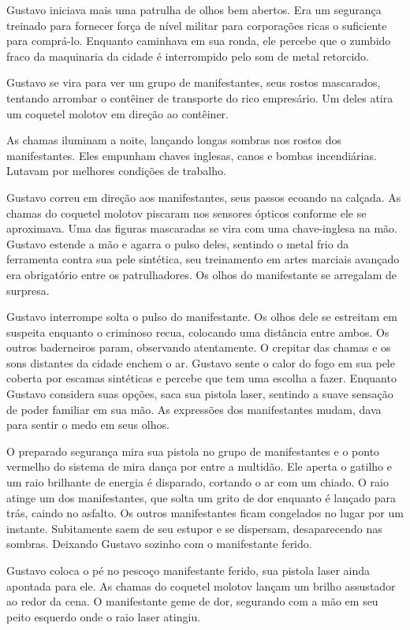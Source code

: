 \documentclass[a4paper,14pt]{book}
\begin{document}
Gustavo iniciava mais uma patrulha de olhos bem abertos. Era um segurança treinado para fornecer força de nível militar para corporações ricas o suficiente para comprá-lo. Enquanto caminhava em sua ronda, ele percebe que o zumbido fraco da maquinaria da cidade é interrompido pelo som de metal retorcido.

Gustavo se vira para ver um grupo de manifestantes, seus rostos mascarados, tentando arrombar o contêiner de transporte do rico empresário. Um deles atira um coquetel molotov em direção ao contêiner.

As chamas iluminam a noite, lançando longas sombras nos rostos dos manifestantes. Eles empunham chaves inglesas, canos e bombas incendiárias. Lutavam por melhores condições de trabalho.

Gustavo correu em direção aos manifestantes, seus passos ecoando na calçada. As chamas do coquetel molotov piscaram nos sensores ópticos conforme ele se aproximava. Uma das figuras mascaradas se vira com uma chave-inglesa na mão. Gustavo estende a mão e agarra o pulso deles, sentindo o metal frio da ferramenta contra sua pele sintética, seu treinamento em artes marciais avançado era obrigatório entre os patrulhadores. Os olhos do manifestante se arregalam de surpresa.

Gustavo interrompe solta o pulso do manifestante. Os olhos dele se estreitam em suspeita enquanto o criminoso recua, colocando uma distância entre ambos. Os outros baderneiros param, observando atentamente. O crepitar das chamas e os sons distantes da cidade enchem o ar. Gustavo sente o calor do fogo em sua pele coberta por escamas sintéticas e percebe que tem uma escolha a fazer. Enquanto Gustavo considera suas opções, saca sua pistola laser, sentindo a suave sensação de poder familiar em sua mão. As expressões dos manifestantes mudam, dava para sentir o medo em seus olhos.

O preparado segurança mira sua pistola no grupo de manifestantes e o ponto vermelho do sistema de mira dança por entre a multidão. Ele aperta o gatilho e um raio brilhante de energia é disparado, cortando o ar com um chiado. O raio atinge um dos manifestantes, que solta um grito de dor enquanto é lançado para trás, caindo no asfalto. Os outros manifestantes ficam congelados no lugar por um instante. Subitamente saem de seu estupor e se dispersam, desaparecendo nas sombras. Deixando Gustavo sozinho com o manifestante ferido.

Gustavo coloca o pé no pescoço manifestante ferido, sua pistola laser ainda apontada para ele. As chamas do coquetel molotov lançam um brilho assustador ao redor da cena. O manifestante geme de dor, segurando com a mão em seu peito esquerdo onde o raio laser atingiu.
\end{document}
